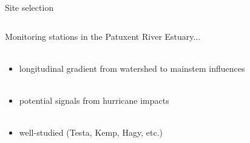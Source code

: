 \documentclass[serif]{beamer}\usepackage[]{graphicx}\usepackage[]{color}
\begin{document}
\begin{frame}{Site selection}
\begin{columns}[T]
\begin{column}{0.45\textwidth}
Monitoring stations in the Patuxent River Estuary... \\~\\
\begin{itemize}
\item longitudinal gradient from watershed to mainstem influences \\~\\
\item potential signals from hurricane impacts \\~\\
\item well-studied (Testa, Kemp, Hagy, etc.)
\end{itemize}
\end{column}
\begin{column}{0.45\textwidth}
\centerline{}
\end{column}
\end{columns}
\end{frame}
\end{document}
